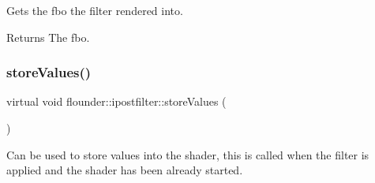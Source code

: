 Gets the fbo the filter rendered into. 

\begin{DoxyReturn}{Returns}
The fbo. 
\end{DoxyReturn}
\mbox{\label{classflounder_1_1ipostfilter_a9b658b4672718d5ac36539875bde722e}} 
\subsubsection{\texorpdfstring{store\+Values()}{storeValues()}}
{\footnotesize\ttfamily virtual void flounder\+::ipostfilter\+::store\+Values (\begin{DoxyParamCaption}{ }\end{DoxyParamCaption})\hspace{0.3cm}{\ttfamily [pure virtual]}}



Can be used to store values into the shader, this is called when the filter is applied and the shader has been already started. 




